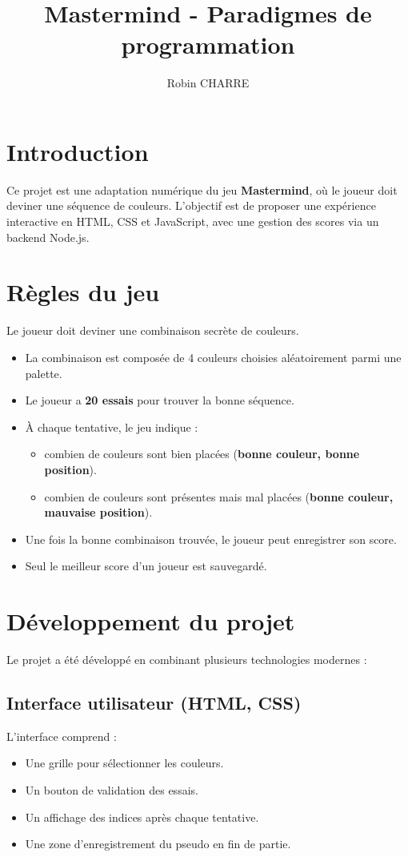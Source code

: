 \documentclass[a4paper,12pt]{article}
\title{Mastermind - Paradigmes de programmation}
\author{Robin CHARRE}
\begin{document}
\maketitle

\section{Introduction}
Ce projet est une adaptation numérique du jeu \textbf{Mastermind}, où le joueur doit deviner une séquence de couleurs.  
L’objectif est de proposer une expérience interactive en HTML, CSS et JavaScript, avec une gestion des scores via un backend Node.js.  

\section{Règles du jeu}
Le joueur doit deviner une combinaison secrète de couleurs.  
\begin{itemize}
    \item La combinaison est composée de 4 couleurs choisies aléatoirement parmi une palette.
    \item Le joueur a \textbf{20 essais} pour trouver la bonne séquence.
    \item À chaque tentative, le jeu indique :
    \begin{itemize}
        \item combien de couleurs sont bien placées (\textbf{bonne couleur, bonne position}).
        \item combien de couleurs sont présentes mais mal placées (\textbf{bonne couleur, mauvaise position}).
    \end{itemize}
    \item Une fois la bonne combinaison trouvée, le joueur peut enregistrer son score.
    \item Seul le meilleur score d’un joueur est sauvegardé.
\end{itemize}

\section{Développement du projet}
Le projet a été développé en combinant plusieurs technologies modernes :

\subsection{Interface utilisateur (HTML, CSS)}
L’interface comprend :
\begin{itemize}
    \item Une grille pour sélectionner les couleurs.
    \item Un bouton de validation des essais.
    \item Un affichage des indices après chaque tentative.
    \item Une zone d’enregistrement du pseudo en fin de partie.
\end{itemize}
\end{document}
